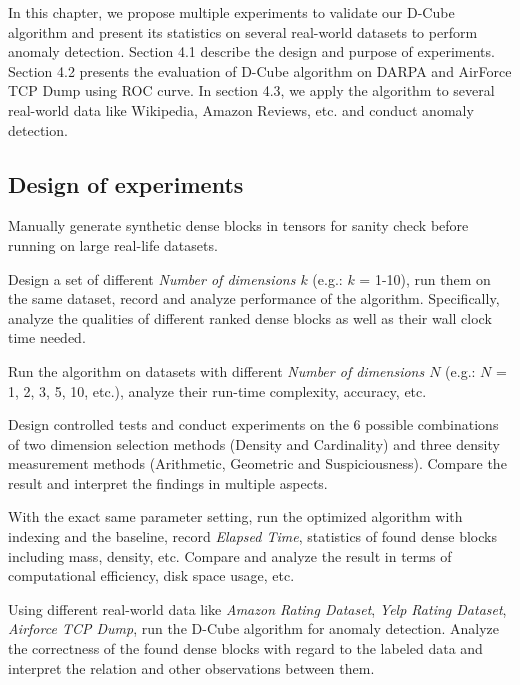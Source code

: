 In this chapter, we propose multiple experiments to validate our D-Cube algorithm and present its statistics on several real-world datasets to perform anomaly detection. Section 4.1 describe the design and purpose of experiments. Section 4.2 presents the evaluation of D-Cube algorithm on DARPA and AirForce TCP Dump using ROC curve. In section 4.3, we apply the algorithm to several real-world data like Wikipedia, Amazon Reviews, etc. and conduct anomaly detection.   

\subsection{Design of experiments}

\bit
\setlength\itemsep{1em}
\item Manually generate synthetic dense blocks in tensors for sanity check before running on large real-life datasets. 

\item Design a set of different \textit{Number of dimensions $k$} (e.g.: $k$ = 1-10), run them on the same dataset, record and analyze performance of the algorithm. Specifically, analyze the qualities of different ranked dense blocks as well as their wall clock time needed. 

\item Run the algorithm on datasets with different \textit{Number of dimensions $N$} (e.g.: $N$ = 1, 2, 3, 5, 10, etc.), analyze their run-time complexity, accuracy, etc.

\item Design controlled tests and conduct experiments on the 6 possible combinations of two dimension selection methods (Density and Cardinality) and three density measurement methods (Arithmetic, Geometric and Suspiciousness). Compare the result and interpret the findings in multiple aspects.

\item With the exact same parameter setting, run the optimized algorithm with indexing and the baseline, record \textit{Elapsed Time}, statistics of found dense blocks including mass, density, etc. Compare and analyze the result in terms of computational efficiency, disk space usage, etc. 

\item Using different real-world data like \textit{Amazon Rating Dataset}, \textit{Yelp Rating Dataset}, \textit{Airforce TCP Dump}, run the D-Cube algorithm for anomaly detection. Analyze the correctness of the found dense blocks with regard to the labeled data and interpret the relation and other observations between them.

